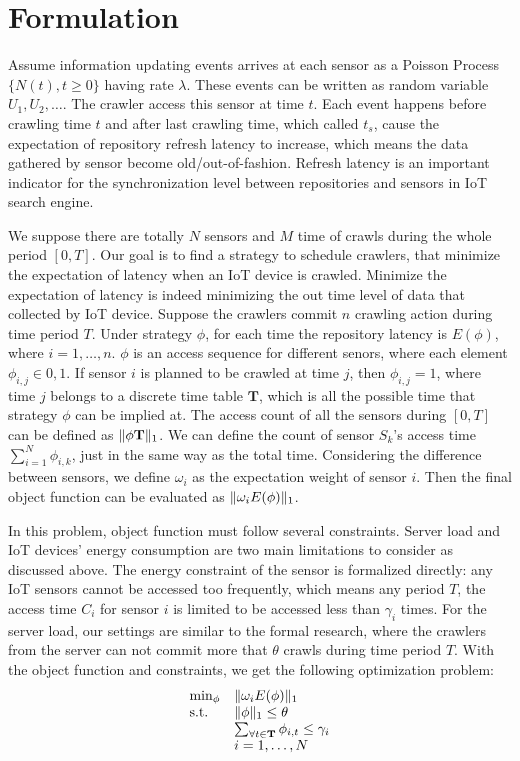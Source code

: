 \documentclass[conference]{IEEEtran}
\begin{document}
\section{Formulation}

Assume information updating events arrives at each sensor as a Poisson Process $\{N(t), t\geq0\}$ having rate $\lambda$. 
These events can be written as random variable $U_1, U_2, \ldots$. The crawler access this sensor at time $t$. Each event happens before crawling time $t$ and after last crawling time, which called $t_s$, cause the  expectation of repository refresh latency to increase, which means the data gathered by sensor become old/out-of-fashion. Refresh latency is an important indicator for the synchronization level between repositories and sensors in IoT search engine.

We suppose there are totally $N$ sensors and $M$ time of crawls during the whole period $[0, T]$. Our goal is to find a strategy to schedule crawlers, that minimize the expectation of latency when an IoT device is crawled. 
Minimize the expectation of latency is indeed minimizing the out time level of data that collected by IoT device. Suppose the crawlers commit $n$ crawling action during time period $T$. 
Under strategy $\phi$, for each time the repository latency is $E(\phi)$, where $i=1,\ldots,n$. 
$\phi$ is an access sequence for different senors, where each element $\phi_{i,j}\in{0,1}$. 
If sensor $i$ is planned to be crawled at time $j$, then $\phi_{i,j}=1$, where time $j$ belongs to a discrete time table $\mathbf{T}$, which is all the possible time that strategy $\phi$ can be implied at.
The access count of all the sensors during $[0, T]$ can be defined as $\Arrowvert\phi\mathbf{T} \Arrowvert_{1}$. We can define the count of sensor $S_k$'s access time $\sum_{i=1}^{N}\phi_{i,k}$, just in the same way as the total time. 
Considering the difference between sensors, we define $\omega_i$ as the expectation weight of sensor $i$. Then the final object function can be evaluated as $\Arrowvert \omega_i E(\phi) \Arrowvert_{1}$.


In this problem, object function must follow several constraints. Server load and IoT devices' energy consumption are two main limitations to consider as discussed above. 
The energy constraint of the sensor is formalized directly: any IoT sensors cannot be accessed too frequently, which means any period $T$, the access time $C_i$ for sensor $i$ is limited to be accessed less than $\gamma_i$ times. For the server load, our settings are similar to the formal research\cite{Wolf2002}, where the crawlers from the server can not commit more that $\theta$ crawls during time period $T$.
With the object function and constraints, we get the following optimization problem:
\begin{eqnarray}
\begin{array}{ll}
\min_{\phi}&\Arrowvert \omega_i E(\phi) \Arrowvert_{1}\\
\text{s.t.} 
&\Arrowvert \phi \Arrowvert_{1}\leq\theta\\
&\sum_{\forall t \in \mathbf{T}}{\phi_{i,t}}\leq\gamma_i\\
&i=1,\ldots,N
\end{array}\label{OBJ}
\end{eqnarray}
\end{document}
